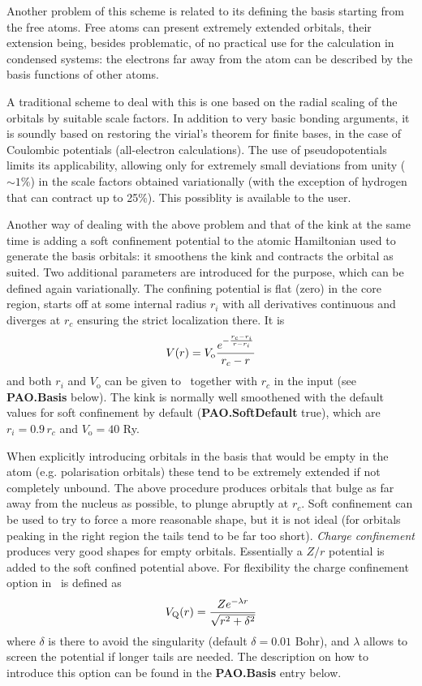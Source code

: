 Another problem of this scheme is related to its defining the basis
starting from the free atoms.  Free atoms can present extremely extended
orbitals, their extension being, besides problematic, of no practical
use for the calculation in condensed systems: the electrons far away
from the atom can be described by the basis functions of other atoms.

A traditional scheme to deal with this is one based on the radial
scaling of the orbitals by suitable scale factors.  In addition to
very basic bonding arguments, it is soundly based on restoring
the virial's theorem for finite bases, in the case of Coulombic potentials
(all-electron calculations).  The use of pseudopotentials limits its
applicability, allowing only for extremely small deviations from unity
($\sim 1\%$) in the scale factors obtained variationally (with the
exception of hydrogen that can contract up to 25\%). This possiblity
is available to the user.

Another way of dealing with the above problem and that of the kink at the
same time is adding a soft confinement potential to the atomic
Hamiltonian used to generate the basis orbitals: it smoothens the kink
and contracts the orbital as suited. Two additional parameters are
introduced for the purpose, which can be defined again variationally.
The confining potential is flat (zero) in the core region, starts off
at some internal radius $r_i$ with all derivatives continuous and
diverges at $r_c$ ensuring the strict localization there.  It is
\begin{equation}
  V(r) = V_{\mathrm o} { e^{- { {r_c - r_i} \over {r - r_i} } } \over {r_c -r} }
\end{equation}
and both $r_i$ and $V_{\mathrm o}$ can be given to \siesta\ together
with $r_c$ in the input (see \textbf{PAO.Basis} below).
The kink is normally well smoothened with the default values 
for soft confinement by default (\textbf{PAO.SoftDefault} true), which 
are $r_i = 0.9 \, r_c$ and $V_{\mathrm o} = 40$ Ry.

When explicitly introducing orbitals in the basis that would be empty in 
the atom (e.g. polarisation orbitals) these tend to be extremely 
extended if not completely unbound. The above procedure produces
orbitals that bulge as far away from the nucleus as possible, to 
plunge abruptly at $r_c$. Soft confinement can be used to try
to force a more reasonable shape, but it is not ideal (for orbitals
peaking in the right region the tails tend to be far too short).
\textit{Charge confinement}  produces
very good shapes for empty orbitals. Essentially a $Z/r$ potential
is added to the soft confined potential above. For flexibility
the charge confinement option in \siesta\ is defined as
\begin{equation}
  V_{\mathrm Q}(r) = {Z e^{-\lambda r} \over \sqrt{r^2 + \delta^2}} 
\end{equation}
where $\delta$ is there to avoid the singularity (default $\delta=0.01$ Bohr),
and $\lambda$ allows to screen the potential if longer tails are needed.
The description on how to introduce this option can be found in
the \textbf{PAO.Basis} entry below.

